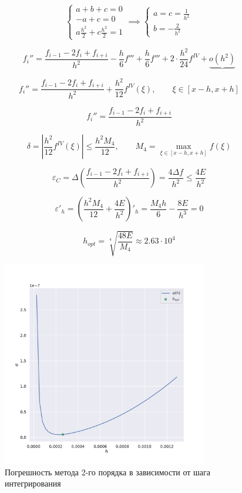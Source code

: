 \documentclass[a4paper,12pt]{article}
\begin{document}
\[
\begin{cases}
    a + b + c =0 \\
    -a + c = 0 \\
    a \frac{h^2}{2} + c \frac{h^2}{2} = 1
\end{cases}
\implies \begin{cases}
    a = c = \frac{1}{h^2} \\
    b = - \frac{2}{h^2}
\end{cases}
\] 

\[
    f_i'' = \frac{f_{i - 1} - 2f_i + f_{i + i} }{h^2}
    - \frac{h}{6} f'''
    + \frac{h}{6} f'''
    + 2 \cdot \frac{h^2}{24} f^{IV}
    + \underbrace{o(h^2)}
\] 

\[
    f_i'' = \frac{f_{i - 1} - 2f_i + f_{i + i} }{h^2}
    + \frac{h^2}{12} f^{IV}(\xi), \qquad
    \xi \in [x - h, x + h]
\] 

\[
   \boxed{f_i'' = \frac{f_{i - 1} - 2f_i + f_{i + i} }{h^2}} 
\] 

\[
    \delta = \left| \frac{h^2}{12}f^{IV}(\xi) \right| 
    \le  \frac{h^2M_4}{12}, \qquad
    M_4 = \max_{ \xi \in [x - h, x + h]} f(\xi)
\] 

\[
    \varepsilon_C = \Delta \left( \frac{f_{i - 1}
    - 2f_i + f_{i + i} }{h^2} \right) 
    = \frac{4\Delta f}{h^2} \le  \frac{4E}{h^2}
\] 

\[
    \varepsilon'_h = \left( \frac{h^2M_4}{12}
    + \frac{4E}{h^2}\right)'_h = \frac{M_4h}{6}
    - \frac{8E}{h^3} = 0
\] 

\[
  \boxed{h_{opt} = \sqrt[4]{\frac{48 E}{M_4}} 
    \approx 2.63 \cdot 10^{4}}  
\] 

\begin{figure}[htpb]
    \centering
    \includegraphics[width=0.8\textwidth]{../img/graph2.pdf}
    \caption{Погрешность метода 2-го порядка в
    зависимости от шага интегрирования}
\end{figure}
    
\end{document}
